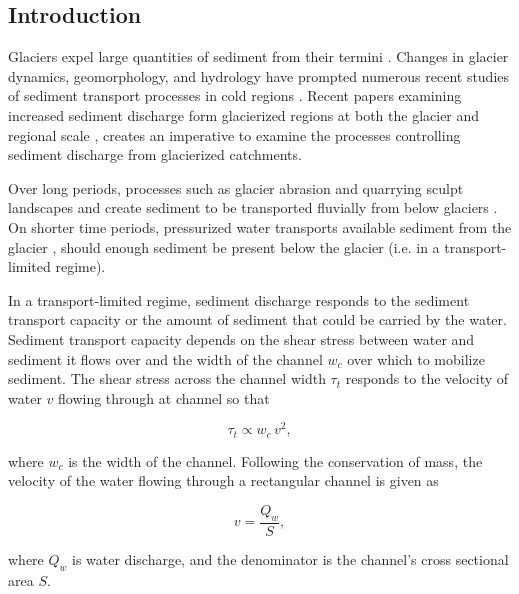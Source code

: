 \documentclass[11pt]{article}
\begin{document}
\begin{spacing}{1}
  \section{Introduction}

  Glaciers expel large quantities of sediment from their termini \citep{hallet1996}.
  Changes in glacier dynamics, geomorphology, and hydrology  have prompted numerous  recent studies of  sediment transport processes in cold regions \citep[e.g.][]{zhang2022}.
  Recent papers examining increased sediment discharge form glacierized regions at both the glacier and regional scale \citep{costa2017,delaney2020,li2022,vergara2022}, creates an imperative to examine the processes controlling sediment discharge from glacierized catchments. 
  
  Over long periods, processes such as glacier abrasion and quarrying sculpt landscapes and create sediment to be transported fluvially from below glaciers \citep[c.f.][]{hallet1979,iverson2012,ugelvig2018}. 
  On shorter time periods, pressurized water transports available sediment from the glacier \citep{walder1994,creyts2013,beaud2018b}, should enough sediment be present below the glacier (i.e. in a transport-limited regime).
  
  In a transport-limited regime, sediment discharge responds to the sediment transport capacity or the amount of sediment that could be carried by the water. Sediment transport capacity depends on the shear stress between water and sediment it flows  over \citep{shields1936,meyer1948,engelund1967} and the width of the channel $w_c$ over which to mobilize sediment. The shear stress  across the channel width $\tau_t$ responds to the velocity of water $v$ flowing through at channel so that 
  \begin{linenomath*}
    \begin{equation}
      \label{eq:tau_t}
      \tau_t \propto w_c\, v^2,
    \end{equation}
  \end{linenomath*}
  where $w_c$ is the width of the channel.
  Following the conservation of mass, the velocity of the water flowing through a rectangular channel is given as 
  \begin{linenomath*}
    \begin{equation}
      \label{eq:v}
      v = \frac{Q_w}{S},
    \end{equation}
  \end{linenomath*}
  where $Q_w$ is water discharge,  and the denominator is the channel's cross sectional area $S$.


\end{spacing}
\end{document}
